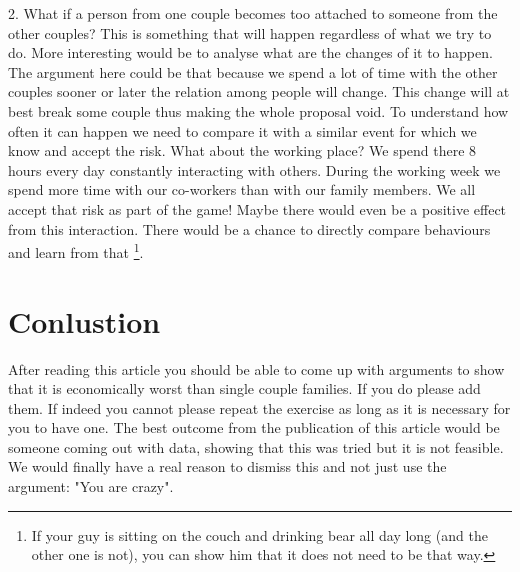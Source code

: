 \documentclass{article}
\begin{document}
2. What if a person from one couple becomes too attached to someone from the other couples?
This is something that will happen regardless of what we try to do.
More interesting would be to analyse what are the changes of it to happen.
The argument here could be that because we spend a lot of time with the other couples sooner or later the relation among people will change.
This change will at best break some couple thus making the whole proposal void.
To understand how often it can happen we need to compare it with a similar event for which we know and accept the risk.
What about the working place?
We spend there 8 hours every day constantly interacting with others.
During the working week we spend more time with our co-workers than with our family members.
We all accept that risk as part of the game!
Maybe there would even be a positive effect from this interaction.
There would be a chance to directly compare behaviours and learn from that
\footnote{If your guy is sitting on the couch and drinking bear all day long (and the other one is not), you can show him that it does not need to be that way.}.

\section{Conlustion}
After reading this article you should be able to come up with arguments to show that it is economically worst than single couple families.
If you do please add them.
If indeed you cannot please repeat the exercise as long as it is necessary for you to have one.
The best outcome from the publication of this article would be someone coming out with data, showing that this was tried but it is not feasible.
We would finally have a real reason to dismiss this and not just use the argument: "You are crazy".

\newpage


\end{document}
